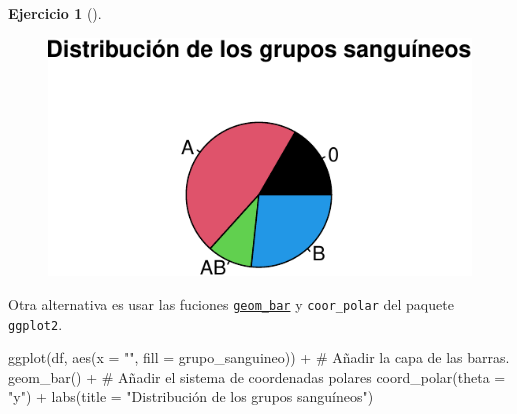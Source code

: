 \documentclass[
  a4paper,
]{scrreport}
\newenvironment{Shaded}{\begin{snugshade}}{\end{snugshade}}
\newcommand{\AttributeTok}[1]{\textcolor[rgb]{0.40,0.45,0.13}{#1}}
\newcommand{\CommentTok}[1]{\textcolor[rgb]{0.37,0.37,0.37}{#1}}
\newcommand{\FunctionTok}[1]{\textcolor[rgb]{0.28,0.35,0.67}{#1}}
\newcommand{\NormalTok}[1]{\textcolor[rgb]{0.00,0.23,0.31}{#1}}
\newcommand{\SpecialCharTok}[1]{\textcolor[rgb]{0.37,0.37,0.37}{#1}}
\newcommand{\StringTok}[1]{\textcolor[rgb]{0.13,0.47,0.30}{#1}}
\theoremstyle{definition}
\newtheorem{exercise}{Ejercicio}[chapter]
\theoremstyle{remark}
\begin{document}
\begin{exercise}[]
\begin{enumerate}
\begin{tcolorbox}
  \begin{figure}[H]

  {\centering \includegraphics{03-frecuencias-graficos_files/figure-pdf/unnamed-chunk-26-1.pdf}

  }

  \end{figure}

  \end{tcolorbox}

  \begin{tcolorbox}[enhanced jigsaw, coltitle=black, left=2mm, colback=white, leftrule=.75mm, toptitle=1mm, breakable, bottomrule=.15mm, titlerule=0mm, bottomtitle=1mm, title=\textcolor{quarto-callout-tip-color}{\faLightbulb}\hspace{0.5em}{Solución 2}, arc=.35mm, toprule=.15mm, rightrule=.15mm, colframe=quarto-callout-tip-color-frame, opacityback=0, colbacktitle=quarto-callout-tip-color!10!white, opacitybacktitle=0.6]

  Otra alternativa es usar las fuciones
  \href{https://aprendeconalf.es/manual-r/07-graficos.html\#diagrama-de-sectores}{\texttt{geom\_bar}}
  y \texttt{coor\_polar} del paquete \texttt{ggplot2}.

\begin{Shaded}
\begin{Highlighting}[]
\FunctionTok{ggplot}\NormalTok{(df, }\FunctionTok{aes}\NormalTok{(}\AttributeTok{x =} \StringTok{""}\NormalTok{, }\AttributeTok{fill =}\NormalTok{ grupo\_sanguineo)) }\SpecialCharTok{+}
    \CommentTok{\# Añadir la capa de las barras.}
    \FunctionTok{geom\_bar}\NormalTok{() }\SpecialCharTok{+}
    \CommentTok{\# Añadir el sistema de coordenadas polares}
    \FunctionTok{coord\_polar}\NormalTok{(}\AttributeTok{theta =} \StringTok{"y"}\NormalTok{) }\SpecialCharTok{+}
    \FunctionTok{labs}\NormalTok{(}\AttributeTok{title =} \StringTok{"Distribución de los grupos sanguíneos"}\NormalTok{)}
\end{Highlighting}
\end{Shaded}


\end{tcolorbox}
\end{enumerate}
\end{exercise}
\end{document}
